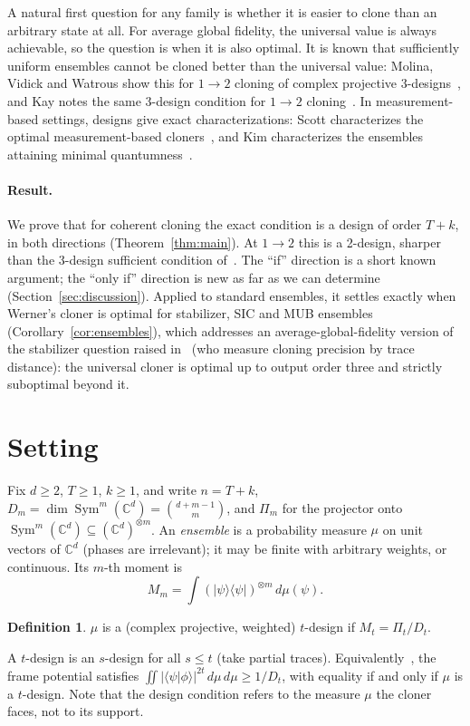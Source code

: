 \documentclass[11pt]{article}
\newcommand{\C}{\mathbb{C}}
\newcommand{\Sym}{\operatorname{Sym}}
\newcommand{\ket}[1]{\lvert #1\rangle}
\newcommand{\bra}[1]{\langle #1\rvert}
\theoremstyle{definition}
\newtheorem{definition}[theorem]{Definition}
\theoremstyle{remark}
\begin{document}
A natural first question for any family is whether it is easier to clone than an arbitrary state at all. For
average global fidelity, the universal value is always achievable, so the question is when it is also optimal. It is
known that sufficiently uniform ensembles cannot be cloned better than the universal value: Molina, Vidick and
Watrous show this for $1\to2$ cloning of complex projective 3-designs~\cite{MVW2012}, and Kay notes the same
3-design condition for $1\to2$ cloning~\cite{Kay2014}. In measurement-based settings, designs give exact
characterizations: Scott characterizes the optimal measurement-based cloners~\cite[Thm.~20]{Scott2006}, and Kim
characterizes the ensembles attaining minimal quantumness~\cite{Kim2006}.

\paragraph{Result.} We prove that for coherent cloning the exact condition is a design of order $T+k$, in both
directions (Theorem~\ref{thm:main}). At $1\to2$ this is a 2-design, sharper than the 3-design sufficient condition
of~\cite{MVW2012}. The ``if'' direction is a short known argument; the ``only if'' direction is new as far as we can
determine (Section~\ref{sec:discussion}). Applied to standard ensembles, it settles exactly when Werner's cloner is
optimal for stabilizer, SIC and MUB ensembles (Corollary~\ref{cor:ensembles}), which addresses an average-global-fidelity
version of the stabilizer question raised in~\cite{Herasymenko2026} (who measure cloning precision by trace distance):
the universal cloner is optimal up to output order three and strictly suboptimal beyond it.

\section{Setting}\label{sec:setting}
Fix $d\ge2$, $T\ge1$, $k\ge1$, and write $n=T+k$, $D_m=\dim\Sym^m(\C^d)=\binom{d+m-1}{m}$, and $\Pi_m$ for the
projector onto $\Sym^m(\C^d)\subseteq(\C^d)^{\otimes m}$. An \emph{ensemble} is a probability measure $\mu$ on unit
vectors of $\C^d$ (phases are irrelevant); it may be finite with arbitrary weights, or continuous. Its $m$-th moment is
\[
M_m=\int(\ket\psi\!\bra\psi)^{\otimes m}\,d\mu(\psi).
\]
\begin{definition}
$\mu$ is a (complex projective, weighted) $t$-design if $M_t=\Pi_t/D_t$.
\end{definition}
A $t$-design is an $s$-design for all $s\le t$ (take partial traces). Equivalently~\cite[Thm.~6]{Scott2006}, the
frame potential satisfies $\iint|\langle\psi|\phi\rangle|^{2t}\,d\mu\,d\mu\ge1/D_t$, with equality if and only if $\mu$
is a $t$-design. Note that the design condition refers to the measure $\mu$ the cloner faces, not to its support.
\end{document}
